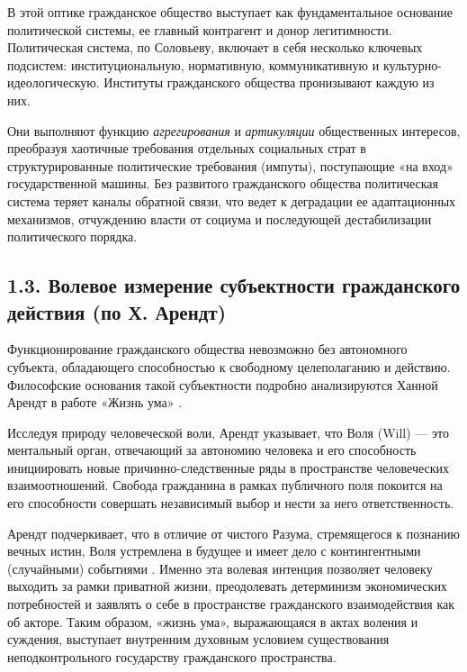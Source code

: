 \documentclass[a4paper, 14pt]{extarticle}
\begin{document}
В этой оптике гражданское общество выступает как фундаментальное основание политической системы, ее главный контрагент и донор легитимности. Политическая система, по Соловьеву, включает в себя несколько ключевых подсистем: институциональную, нормативную, коммуникативную и культурно-идеологическую. Институты гражданского общества пронизывают каждую из них. 

Они выполняют функцию \textit{агрегирования} и \textit{артикуляции} общественных интересов, преобразуя хаотичные требования отдельных социальных страт в структурированные политические требования (импуты), поступающие «на вход» государственной машины. Без развитого гражданского общества политическая система теряет каналы обратной связи, что ведет к деградации ее адаптационных механизмов, отчуждению власти от социума и последующей дестабилизации политического порядка.

\subsection{1.3. Волевое измерение субъектности гражданского действия (по Х. Арендт)}
Функционирование гражданского общества невозможно без автономного субъекта, обладающего способностью к свободному целеполаганию и действию. Философские основания такой субъектности подробно анализируются Ханной Арендт в работе «Жизнь ума» \cite{Arendt}. 

Исследуя природу человеческой воли, Арендт указывает, что Воля (Will) --- это ментальный орган, отвечающий за автономию человека и его способность инициировать новые причинно-следственные ряды в пространстве человеческих взаимоотношений. Свобода гражданина в рамках публичного поля покоится на его способности совершать независимый выбор и нести за него ответственность. 

Арендт подчеркивает, что в отличие от чистого Разума, стремящегося к познанию вечных истин, Воля устремлена в будущее и имеет дело с контингентными (случайными) событиями \cite{Arendt}. Именно эта волевая интенция позволяет человеку выходить за рамки приватной жизни, преодолевать детерминизм экономических потребностей и заявлять о себе в пространстве гражданского взаимодействия как об акторе. Таким образом, «жизнь ума», выражающаяся в актах воления и суждения, выступает внутренним духовным условием существования неподконтрольного государству гражданского пространства.

\newpage

\end{document}
